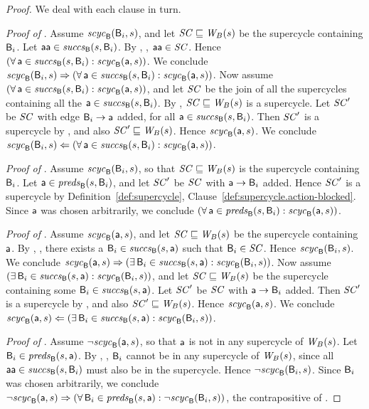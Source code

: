 \begin{proof}
We deal with each clause in turn.


\textit{Proof of }.
%
Assume $\scyc{\B}{s}{\B_i}$, and let $\SC \subg \wfg{B}{s}$ be the supercycle containing $\B_i$.  Let
$\actp \in \succs{\B}{s}{\B_i}$.  By , ,
$\actp \in \SC$.  Hence $(\fa \act \in \succs{\B}{s}{\B_i} : \scyc{\B}{s}{\act})$.
We conclude
$\scyc{\B}{s}{\B_i} \imp (\fa \act \in \succs{\B}{s}{\B_i} : \scyc{\B}{s}{\act})$.
%
Now assume $(\fa \act \in \succs{\B}{s}{\B_i} : \scyc{\B}{s}{\act})$, and let 
$\SC$ be the join of all the supercycles containing all the $\act \in \succs{\B}{s}{\B_i}$. 
By , $\SC \subg \wfg{B}{s}$ is a supercycle.
Let $\SC'$ be $\SC$ with edge $\B_i \ar \act$ added, for all 
$\act \in \succs{\B}{s}{\B_i}$.
Then $\SC'$ is a supercycle by 
, and also $\SC' \subg \wfg{B}{s}$. Hence $\scyc{\B}{s}{\act}$.
We conclude 
$\scyc{\B}{s}{\B_i} \folf (\fa \act \in \succs{\B}{s}{\B_i} : \scyc{\B}{s}{\act})$.




\textit{Proof of }.
%
Assume $\scyc{\B}{s}{\B_i}$, so that $\SC \subg \wfg{B}{s}$ is the supercycle containing $\B_i$.
Let  $\act \in \preds{\B}{s}{\B_i}$, and let $\SC'$ be $\SC$ with 
$\act \ar \B_i$ added. Hence $\SC'$ is a supercycle 
by Definition~\ref{def:supercycle},
  Clause~\ref{def:supercycle.action-blocked}.
Since $\act$ was chosen arbitrarily, we conclude 
$(\fa \act \in \preds{\B}{s}{\B_i} : \scyc{\B}{s}{\act})$.



\textit{Proof of }.
%
Assume $\scyc{\B}{s}{\act}$, and let $\SC \subg \wfg{B}{s}$ be the supercycle containing $\act$.  By
, , there exists a
$\B_i \in \succs{\B}{s}{\act}$ such that $\B_i \in \SC$.  Hence $\scyc{\B}{s}{\B_i}$.
We conclude
$\scyc{\B}{s}{\act} \imp (\ex \B_i \in \succs{\B}{s}{\act} : \scyc{\B}{s}{\B_i})$.
%
Now assume $(\ex \B_i \in \succs{\B}{s}{\act} : \scyc{\B}{s}{\B_i})$, and let 
$\SC \subg \wfg{B}{s}$ be the supercycle containing some $\B_i \in \succs{\B}{s}{\act}$. 
Let $\SC'$ be $\SC$ with $\act \ar \B_i$ added. Then $\SC'$ is a supercycle by 
, and also $\SC' \subg \wfg{B}{s}$. Hence $\scyc{\B}{s}{\act}$.
We conclude 
$\scyc{\B}{s}{\act} \folf (\ex \B_i \in \succs{\B}{s}{\act} : \scyc{\B}{s}{\B_i})$.


\textit{Proof of }.  
%
Assume $\neg \scyc{\B}{s}{\act}$, so that $\act$ is not in any supercycle of $\wfg{B}{s}$.
Let $\B_i \in \preds{\B}{s}{\act}$. 
By , , 
$\B_i$ cannot be in any supercycle of $\wfg{B}{s}$, since all $\actp \in \succs{\B}{s}{\B_i}$ must
also be in the supercycle. Hence $\neg \scyc{\B}{s}{\B_i}$.
Since $\B_i$ was chosen arbitrarily, we conclude
$\neg \scyc{\B}{s}{\act} \imp  (\fa \B_i \in \preds{\B}{s}{\act} : \neg \scyc{\B}{s}{\B_i})$, the
contrapositive of .  
\end{proof}


